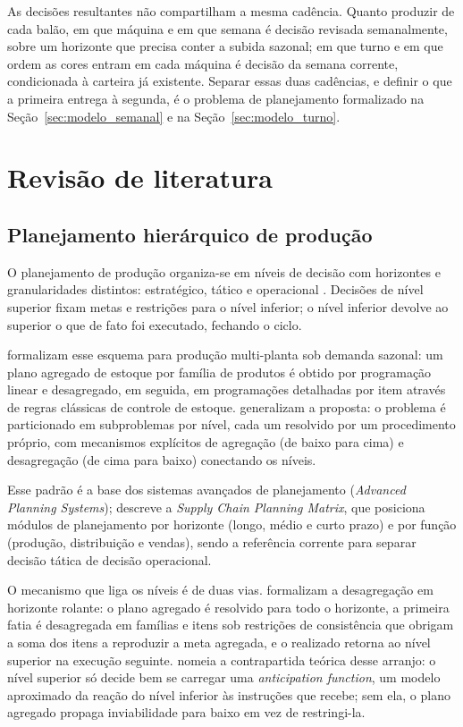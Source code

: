\documentclass[fleqn,12pt,a4paper]{article}
\begin{document}
As decisões resultantes não compartilham a mesma cadência. Quanto produzir de cada balão, em que máquina e em que semana é decisão revisada semanalmente, sobre um horizonte que precisa conter a subida sazonal; em que turno e em que ordem as cores entram em cada máquina é decisão da semana corrente, condicionada à carteira já existente. Separar essas duas cadências, e definir o que a primeira entrega à segunda, é o problema de planejamento formalizado na Seção~\ref{sec:modelo_semanal} e na Seção~\ref{sec:modelo_turno}.

\newpage

\section{Revisão de literatura}

\subsection{Planejamento hierárquico de produção}

O planejamento de produção organiza-se em níveis de decisão com horizontes e granularidades distintos: estratégico, tático e operacional \cite{anthony1965}. Decisões de nível superior fixam metas e restrições para o nível inferior; o nível inferior devolve ao superior o que de fato foi executado, fechando o ciclo.

 formalizam esse esquema para produção multi-planta sob demanda sazonal: um plano agregado de estoque por família de produtos é obtido por programação linear e desagregado, em seguida, em programações detalhadas por item através de regras clássicas de controle de estoque.  generalizam a proposta: o problema é particionado em subproblemas por nível, cada um resolvido por um procedimento próprio, com mecanismos explícitos de agregação (de baixo para cima) e desagregação (de cima para baixo) conectando os níveis.

Esse padrão é a base dos sistemas avançados de planejamento (\textit{Advanced Planning Systems});  descreve a \textit{Supply Chain Planning Matrix}, que posiciona módulos de planejamento por horizonte (longo, médio e curto prazo) e por função (produção, distribuição e vendas), sendo a referência corrente para separar decisão tática de decisão operacional.

O mecanismo que liga os níveis é de duas vias.  formalizam a desagregação em horizonte rolante: o plano agregado é resolvido para todo o horizonte, a primeira fatia é desagregada em famílias e itens sob restrições de consistência que obrigam a soma dos itens a reproduzir a meta agregada, e o realizado retorna ao nível superior na execução seguinte.  nomeia a contrapartida teórica desse arranjo: o nível superior só decide bem se carregar uma \textit{anticipation function}, um modelo aproximado da reação do nível inferior às instruções que recebe; sem ela, o plano agregado propaga inviabilidade para baixo em vez de restringi-la.
\end{document}
